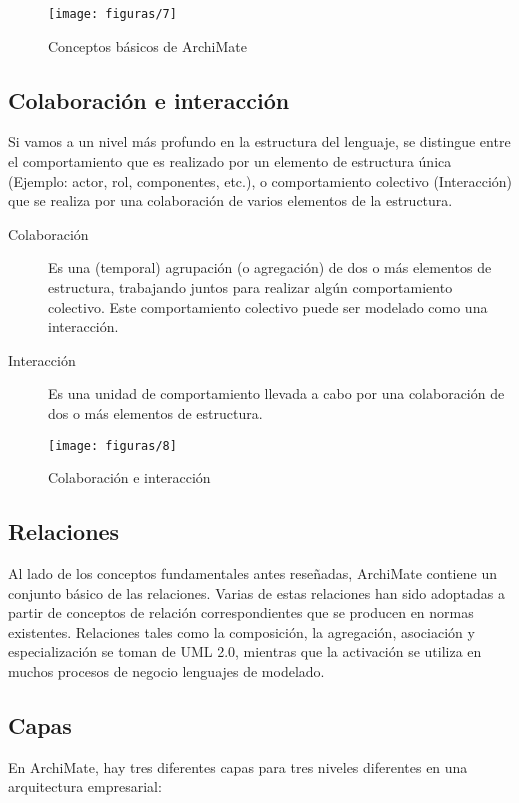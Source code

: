      \begin{figure}[H]
     	\centering
     	\texttt{[image: figuras/7]}
     	\captionsetup{width=.95\textwidth}
     	\caption{Conceptos básicos de ArchiMate}
     	\label{figura7}
     \end{figure}
  
  \subsection{Colaboración e interacción}
  Si vamos a un nivel más profundo en la estructura del lenguaje, se distingue entre el comportamiento que es realizado por un elemento de estructura única (Ejemplo: actor, rol, componentes, etc.), o comportamiento colectivo (Interacción) que se realiza por una colaboración de varios elementos de la estructura.
  
  \begin{description}
  	\item[Colaboración] Es una (temporal) agrupación (o agregación) de dos o más elementos de estructura, trabajando juntos para realizar algún comportamiento colectivo. Este comportamiento colectivo puede ser modelado como una interacción.
  	\item[Interacción] Es una unidad de comportamiento llevada a cabo por una colaboración de dos o más elementos de estructura.
  \end{description}
 
  \begin{figure}[H]
   	\centering
   	\texttt{[image: figuras/8]}
   	\captionsetup{width=.95\textwidth}
   	\caption{Colaboración e interacción}
   	\label{figura8}
  \end{figure}
  
  \subsection{Relaciones}
  Al lado de los conceptos fundamentales antes reseñadas, ArchiMate contiene un conjunto básico de las relaciones. Varias de estas relaciones han sido adoptadas a partir de conceptos de relación correspondientes que se producen en normas existentes. Relaciones tales como la composición, la agregación, asociación y especialización se toman de UML 2.0, mientras que la activación se utiliza en muchos procesos de negocio lenguajes de modelado.
  
  \subsection{Capas}
  En ArchiMate, hay tres diferentes capas para tres niveles diferentes en una arquitectura empresarial:
  
